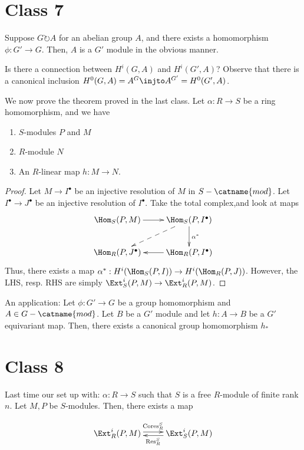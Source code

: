 \documentclass[12pt]{scrartcl}
\begin{document}
\section{Class 7}
Suppose $G \circlearrowright A$ for an abelian group $A$, and there exists a homomorphism $\phi: G' \to G$.
Then, $A$ is a $G'$ module in the obvious manner.

Is there a connection between $H^i(G, A)$ and $H^i(G', A)$? 
Observe that there is a canonical inclusion $H^0(G, A) = A^G \injto A^{G'} = H^0(G', A)$.

We now prove the theorem proved in the last class.
Let $\alpha: R \to S$ be a ring homomorphism, and we have
\begin{enumerate}
	\item $S$-modules $P$ and $M$
	\item $R$-module $N$ 
	\item An $R$-linear map $h: M \to N$. 
\end{enumerate}

\begin{proof}
Let $M \to I^{\bullet}$ be an injective resolution of $M$ in $S-\catname{mod}$.
Let $I^{\bullet} \to J^{\bullet}$ be an injective resolution of $I^{\bullet}$.
Take the total complex,and look at maps 
\[
	\xymatrix{
	\Hom_S(P, M) \ar[r] & \Hom_S(P, I^{\bullet}) \ar[d]^{\alpha^*}\ar@{-->}[dl]\\
               \Hom_R(P, J^{\bullet}) & \Hom_R(P, I^{\bullet}) \ar[l] \\
       }
\]
Thus, there exists a map $\alpha^{*}: H^i(\Hom_S(P, I)) \to H^i(\Hom_R(P, J))$.
However, the LHS, resp. RHS are simply $\Ext_S^i(P, M) \to \Ext_R^i(P, M)$.  
\end{proof}

An application: Let $\phi: G' \to G$ be a group homomorphism and $A \in G-\catname{mod}$.
Let $B$ be a $G'$ module and let $h: A \to B$ be a $G'$ equivariant map.
Then, there exists a canonical group homomorphism $h_{*}$ 

\section{Class 8}

Last time our set up with: $\alpha: R \to S$ such that $S$ is a free $R$-module of finite rank $n$.
Let $M, P$ be $S$-modules.
Then, there exists a map 

\[
\xymatrix{
	\Ext_R^i(P, M) \ar@<0.5ex>[r]^{\text{Cores}^S_R} &  \Ext_S^i(P, M) \ar@<0.5ex>[l]^{\text{Res}_R^S}
}
\]
\end{document}
